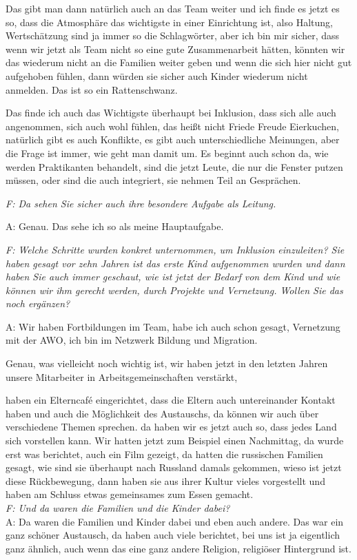 \begin{linenumbers*}
Das gibt man dann natürlich auch an das Team weiter und ich finde es jetzt es so, dass die Atmosphäre das wichtigste in einer Einrichtung ist, also Haltung, Wertschätzung sind ja immer so die Schlagwörter, aber ich bin mir sicher, dass wenn wir jetzt als Team nicht so eine gute Zusammenarbeit hätten, könnten wir das wiederum nicht an die Familien weiter geben und wenn die sich hier nicht gut aufgehoben fühlen, dann würden sie sicher auch Kinder wiederum nicht anmelden. Das ist so ein Rattenschwanz. 

Das finde ich auch das Wichtigste überhaupt bei Inklusion, dass sich alle auch angenommen, sich auch wohl fühlen, das heißt nicht Friede Freude Eierkuchen, natürlich gibt es auch Konflikte, es gibt auch unterschiedliche Meinungen, aber die Frage ist immer, wie geht man damit um. Es beginnt auch schon da, wie werden Praktikanten behandelt, sind die jetzt Leute, die nur die Fenster putzen müssen, oder sind die auch integriert, sie nehmen Teil an Gesprächen. 

\emph{F: Da sehen Sie sicher auch ihre besondere Aufgabe als Leitung.}

A: Genau. Das sehe ich so als meine Hauptaufgabe. 

\emph{F: Welche Schritte wurden konkret unternommen, um Inklusion einzuleiten? Sie haben gesagt vor zehn Jahren ist das erste Kind aufgenommen wurden und dann haben Sie auch immer geschaut, wie ist jetzt der Bedarf von dem Kind und wie können wir ihm gerecht werden, durch Projekte und Vernetzung. Wollen Sie das noch ergänzen?}

A: Wir haben Fortbildungen im Team, habe ich auch schon gesagt, Vernetzung mit der AWO, ich bin im Netzwerk Bildung und Migration. 

Genau, was vielleicht noch wichtig ist, wir haben jetzt in den letzten Jahren unsere Mitarbeiter in Arbeitsgemeinschaften verstärkt, 

haben ein Elterncafé eingerichtet, dass die Eltern auch untereinander Kontakt haben und auch die Möglichkeit des Austauschs, da können wir auch über verschiedene Themen sprechen. 
da haben wir es jetzt auch so, dass jedes Land sich vorstellen kann. Wir hatten jetzt zum Beispiel einen Nachmittag, da wurde erst was berichtet, auch ein Film gezeigt, da hatten die russischen Familien gesagt, wie sind sie überhaupt nach Russland damals gekommen, wieso ist jetzt diese Rückbewegung, dann haben sie aus ihrer Kultur vieles vorgestellt und haben am Schluss etwas gemeinsames zum Essen gemacht.\\
\emph{F: Und da waren die Familien und die Kinder dabei?}\\
A: Da waren die Familien und Kinder dabei und eben auch andere. Das war ein ganz schöner Austausch, da haben auch viele berichtet, bei uns ist ja eigentlich ganz ähnlich, auch wenn das eine ganz andere Religion, religiöser Hintergrund ist.   


\end{linenumbers*}
